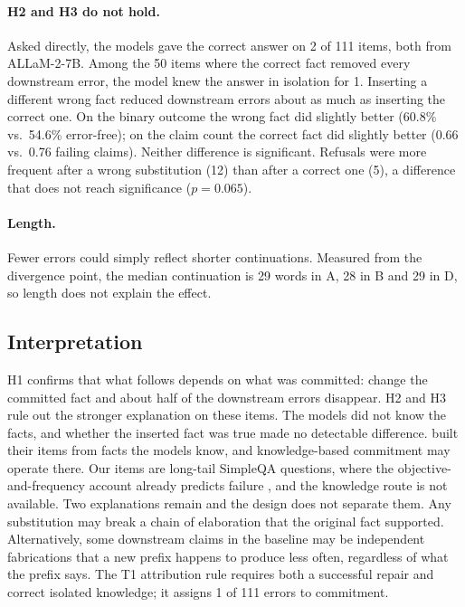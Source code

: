 \documentclass[10pt]{article}
\begin{document}
\paragraph{H2 and H3 do not hold.} Asked directly, the models gave the correct answer on 2 of 111 items, both from ALLaM-2-7B. Among the 50 items where the correct fact removed every downstream error, the model knew the answer in isolation for 1. Inserting a different wrong fact reduced downstream errors about as much as inserting the correct one. On the binary outcome the wrong fact did slightly better (60.8\% vs.\ 54.6\% error-free); on the claim count the correct fact did slightly better (0.66 vs.\ 0.76 failing claims). Neither difference is significant. Refusals were more frequent after a wrong substitution (12) than after a correct one (5), a difference that does not reach significance ($p=0.065$).

\paragraph{Length.} Fewer errors could simply reflect shorter continuations. Measured from the divergence point, the median continuation is 29 words in A, 28 in B and 29 in D, so length does not explain the effect.

\subsection{Interpretation}

H1 confirms that what follows depends on what was committed: change the committed fact and about half of the downstream errors disappear. H2 and H3 rule out the stronger explanation on these items. The models did not know the facts, and whether the inserted fact was true made no detectable difference. \citet{zhang2024snowball} built their items from facts the models know, and knowledge-based commitment may operate there. Our items are long-tail SimpleQA questions, where the objective-and-frequency account already predicts failure \citep{kandpal2023}, and the knowledge route is not available. Two explanations remain and the design does not separate them. Any substitution may break a chain of elaboration that the original fact supported. Alternatively, some downstream claims in the baseline may be independent fabrications that a new prefix happens to produce less often, regardless of what the prefix says. The T1 attribution rule requires both a successful repair and correct isolated knowledge; it assigns 1 of 111 errors to commitment.
\end{document}
